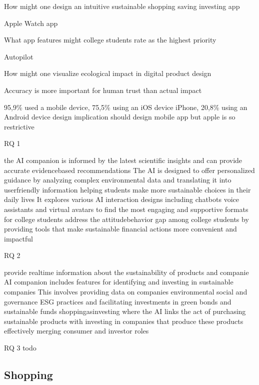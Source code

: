 \documentclass[
  letterpaper,
  DIV=11,
  numbers=noendperiod]{scrartcl}
\begin{document}
How might one design an intuitive sustainable shopping saving investing
app

Apple Watch app

What app features might college students rate as the highest priority

Autopilot

How might one visualize ecological impact in digital product design

Accuracy is more important for human trust than actual impact

95,9\% used a mobile device, 75,5\% using an iOS device iPhone, 20,8\%
using an Android device design implication should design mobile app but
apple is so restrictive

RQ 1

the AI companion is informed by the latest scientific insights and can
provide accurate evidencebased recommendations The AI is designed to
offer personalized guidance by analyzing complex environmental data and
translating it into userfriendly information helping students make more
sustainable choices in their daily lives It explores various AI
interaction designs including chatbots voice assistants and virtual
avatars to find the most engaging and supportive formats for college
students address the attitudebehavior gap among college students by
providing tools that make sustainable financial actions more convenient
and impactful

RQ 2

provide realtime information about the sustainability of products and
companie AI companion includes features for identifying and investing in
sustainable companies This involves providing data on companies
environmental social and governance ESG practices and facilitating
investments in green bonds and sustainable funds shoppingasinvesting
where the AI links the act of purchasing sustainable products with
investing in companies that produce these products effectively merging
consumer and investor roles

RQ 3 todo

\newpage

\subsection{Shopping}\label{shopping-1}
\end{document}
